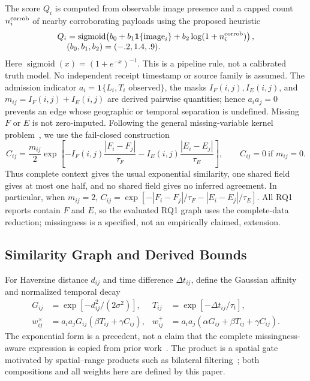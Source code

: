 \documentclass[runningheads]{llncs}
\begin{document}
The score $Q_i$ is computed from observable image presence and a capped count
$n_i^{\rm corrob}$ of nearby corroborating payloads using the proposed
heuristic
\[
\begin{aligned}
Q_i&=\operatorname{sigmoid}\!\left(b_0+b_1\mathbf{1}\{\text{image}_i\}
 +b_2\log(1+n_i^{\rm corrob})\right),\\[-1mm]
&(b_0,b_1,b_2)=(-.2,1.4,.9).
\end{aligned}
\]
Here $\operatorname{sigmoid}(x)=(1+e^{-x})^{-1}$.
This is a pipeline rule, not a calibrated truth model. No independent receipt
timestamp or source family is assumed. The admission indicator
$a_i=\mathbf{1}\{L_i,T_i\text{ observed}\}$, the masks
$I_F(i,j),I_E(i,j)$, and $m_{ij}=I_F(i,j)+I_E(i,j)$ are derived pairwise
quantities; hence $a_i a_j=0$ prevents an edge whose geographic or temporal
separation is undefined. Missing $F$ or $E$ is not zero-imputed. Following the general
missing-variable kernel problem~\cite{smola2005missing}, we use the
fail-closed construction
\[
C_{ij}=\frac{m_{ij}}{2}\exp\!\left[-I_F(i,j)\frac{|F_i-F_j|}{\tau_F}
-I_E(i,j)\frac{|E_i-E_j|}{\tau_E}\right],\qquad
C_{ij}=0\ \text{if }m_{ij}=0.
\]
Thus complete context gives the usual exponential similarity, one shared
field gives at most one half, and no shared field gives no inferred
agreement. In particular, when $m_{ij}=2$,
$C_{ij}=\exp[-|F_i-F_j|/\tau_F-|E_i-E_j|/\tau_E]$. All RQ1 reports contain
$F$ and $E$, so the evaluated RQ1 graph
uses the complete-data reduction; missingness is a specified, not an
empirically claimed, extension.

\subsection{Similarity Graph and Derived Bounds}

For Haversine distance $d_{ij}$ and time difference $\Delta t_{ij}$, define
the Gaussian affinity~\cite{ng2001spectral} and normalized temporal decay
\cite{zhou2013triggering}
\begin{align}
G_{ij}&=\exp[-d_{ij}^{2}/(2\sigma^2)],&
T_{ij}&=\exp[-\Delta t_{ij}/\tau_t],\nonumber\\
w^\times_{ij}&=a_i a_jG_{ij}(\beta T_{ij}+\gamma C_{ij}),&
w^+_{ij}&=a_i a_j(\alpha G_{ij}+\beta T_{ij}+\gamma C_{ij}).
\label{eq:similarities}
\end{align}
The exponential form is a precedent, not a claim that the complete
missingness-aware expression is copied from prior work~\cite{billot2008exponential}.
The product is a spatial gate motivated by spatial--range products such as
bilateral filtering~\cite{tomasi1998bilateral}; both compositions and all
weights here are defined by this paper.
\end{document}
